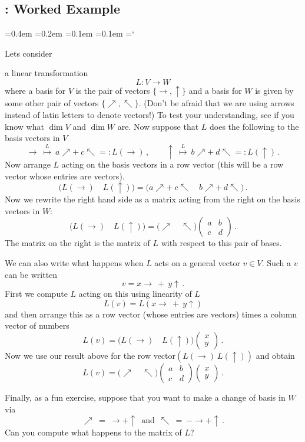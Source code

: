 
\subsection{\eigenTitle: Worked Example}

{\ttfamily
{}\font=0.4em
\font=0.2em
\font=0.1em
\font=0.1em
\hyphenchar\font=`\-


\hypertarget{scripts_eigenvalseigenvects_matrix}{Lets consider }
a linear transformation 
$$L:V\longrightarrow W$$
where a basis for $V$ is the pair of vectors $\{\to,\uparrow\}$
and a basis for $W$ is given by some other pair of vectors $\{\nearrow,\nwarrow\}$. (Don't be afraid that we are using arrows instead of latin letters to denote vectors!) To test your understanding, see if you know what $\dim V$ and $\dim W$ are. Now suppose that $L$ does the 
following to the basis vectors in $V$
$$
\to \ \stackrel{L}\mapsto\  a\nearrow + \ c\nwarrow =: L(\to)\, ,\qquad \uparrow \ \stackrel{L}\mapsto \ 
b\nearrow +\  d\nwarrow=: L(\uparrow)\, .
$$
Now arrange $L$ acting on the basis vectors in a row vector (this will be a row vector whose entries are vectors).
$$
\big(L(\to)\quad L(\uparrow)\big)
=
\big(a\nearrow + \ c\nwarrow\quad b\nearrow + \ d\nwarrow\big)\, .
$$
Now we rewrite the right hand side as a matrix acting from the right on the basis vectors in $W$:
$$
\big(L(\to)\quad L(\uparrow)\big)
=
\big(\nearrow\quad \nwarrow\big)
\begin{pmatrix}
a&b\\c&d
\end{pmatrix}\, .
$$
The matrix on the right is the matrix of $L$ with respect to this pair of bases.

We can also write what happens when $L$ acts on a general vector $v\in V$. Such a $v$ can be written
$$
v=x \to \ + \ y \uparrow\, .
$$
First we compute $L$ acting on this using linearity of $L$
$$
L(v) = L(x \to \ + \ y \uparrow)
$$
and then arrange this as a row vector (whose entries are vectors) times a column vector of numbers
$$
L(v) = \big(L(\to)\quad  L(\uparrow)\big)\begin{pmatrix}x\\y\end{pmatrix}\, .
$$ 
Now we use our result above for the row vector$(L(\to)\ L(\uparrow))$
and obtain
$$
L(v) = \big(\nearrow\quad \nwarrow\big)
\begin{pmatrix}
a&b\\c&d
\end{pmatrix}
\begin{pmatrix}x\\y\end{pmatrix}\, .
$$

Finally, as a fun exercise, suppose that you want to make a change of basis in $W$ via
$$
\nearrow \ = \ \to + \uparrow\, \mbox{ and } \, \nwarrow\ =\  -\to + \uparrow\, .
$$
Can you compute what happens to the matrix of $L$?

} %

\newpage
